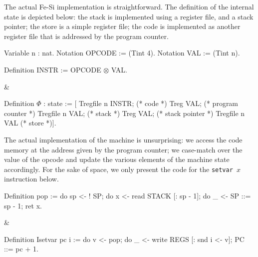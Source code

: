 \documentclass{llncs}
\begin{document}
The actual Fe-Si implementation is straightforward. The definition of
the internal state is depicted below: the stack is implemented using a
register file, and a stack pointer; the store is a simple register
file; the code is implemented as another register file that is
addressed by the program counter.

\begin{twolistings}
\begin{coq}
Variable n : nat. 
Notation OPCODE := (Tint 4).  
Notation VAL := (Tint n). 

Definition INSTR := OPCODE $\otimes$ VAL.  
$ $
\end{coq}
&
\begin{coq}
Definition $\Phi$ : state := [
Tregfile n INSTR;       (* code *)
Treg VAL;               (* program counter *)
Tregfile n VAL;         (* stack *)
Treg VAL;               (* stack pointer *)
Tregfile n VAL          (* store *)]. 
\end{coq}
\end{twolistings}

The actual implementation of the machine is unsurprising: we access
the code memory at the address given by the program counter; we
case-match over the value of the opcode and update the various
elements of the machine state accordingly. 
%
For the sake of space, we only present the code for the \texttt{setvar
  $x$} instruction below.

\begin{twolistings}
\begin{coq}
Definition pop :=
do sp <- ! SP;       
do x <- read STACK [: sp - 1];
do _ <- SP ::= sp - 1;
ret x.    
\end{coq}
&
\begin{coq}
Definition Isetvar pc i := 
do v <- pop; 
do _ <- write REGS [: snd i <- v];
PC ::= pc + 1.
$ $
\end{coq}
\end{twolistings}
\end{document}
